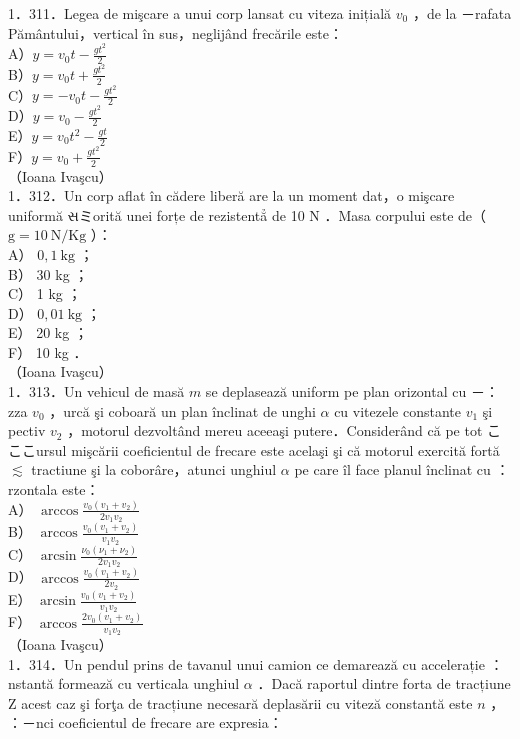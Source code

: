 \documentclass[10pt]{article}
\begin{document}
1．311．Legea de mişcare a unui corp lansat cu viteza inițială $v_{0}$ ，de la －rafata Pământului，vertical în sus，neglijând frecările este：\\
A）$y=v_{0} t-\frac{g t^{2}}{2}$\\
B）$y=v_{0} t+\frac{g t^{2}}{2}$\\
C）$y=-v_{0} t-\frac{g t^{2}}{2}$\\
D）$y=v_{0}-\frac{g t^{2}}{2}$\\
E）$y=v_{0} t^{2}-\frac{g t}{2}$\\
F）$y=v_{0}+\frac{g t^{2}}{2}$\\
（Ioana Ivaşcu）\\
1．312．Un corp aflat în cădere liberă are la un moment dat，o mişcare uniformă સミorită unei forțe de rezistentẳ de 10 N ．Masa corpului este de（ $\mathrm{g}=10 \mathrm{~N} / \mathrm{Kg}$ ）：\\
A） $0,1 \mathrm{~kg}$ ；\\
B） 30 kg ；\\
C） 1 kg ；\\
D） $0,01 \mathrm{~kg}$ ；\\
E） 20 kg ；\\
F） 10 kg ．\\
（Ioana Ivaşcu）\\
1．313．Un vehicul de masă $m$ se deplasează uniform pe plan orizontal cu －：zza $v_{0}$ ，urcă şi coboară un plan înclinat de unghi $\alpha$ cu vitezele constante $v_{1}$ şi pectiv $v_{2}$ ，motorul dezvoltând mereu aceeaşi putere．Considerând că pe tot こここursul mişcării coeficientul de frecare este acelaşi şi că motorul exercită fortă $\lesssim$ tractiune şi la coborâre，atunci unghiul $\alpha$ pe care îl face planul înclinat cu ：rzontala este：\\
A） $\arccos \frac{v_{0}\left(v_{1}+v_{2}\right)}{2 v_{1} v_{2}}$\\
B） $\arccos \frac{v_{0}\left(v_{1}+v_{2}\right)}{v_{1} v_{2}}$\\
C） $\arcsin \frac{\nu_{0}\left(\nu_{1}+\nu_{2}\right)}{2 v_{1} v_{2}}$\\
D） $\arccos \frac{v_{0}\left(v_{1}+v_{2}\right)}{2 v_{2}}$\\
E） $\arcsin \frac{v_{0}\left(v_{1}+v_{2}\right)}{v_{1} v_{2}}$\\
F） $\arccos \frac{2 v_{0}\left(v_{1}+v_{2}\right)}{v_{1} v_{2}}$\\
（Ioana Ivaşcu）\\
1．314．Un pendul prins de tavanul unui camion ce demarează cu accelerație ：nstantă formează cu verticala unghiul $\alpha$ ．Dacă raportul dintre forta de tracțiune Z acest caz şi forţa de tracțiune necesară deplasării cu viteză constantă este $n$ ， ：－nci coeficientul de frecare are expresia：\\
\end{document}
